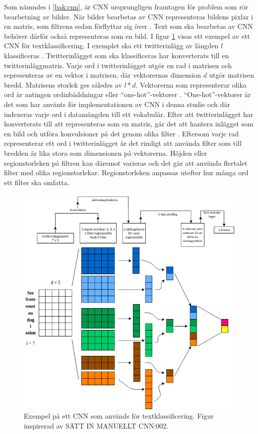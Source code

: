 \documentclass{kaumasters} %
\begin{document}
Som nämndes i \ref{bak:cnn}, är CNN ursprungligen framtagen för problem som rör bearbetning av bilder. När bilder bearbetas av CNN representeras bildens pixlar i en matris, som filtrena sedan förflyttar sig över \cite{cnn:004}. Text som ska bearbetas av CNN behöver därför också representeras som en bild. I figur \ref{fig:cnntext} visas ett exempel av ett CNN för textklassificering. I exemplet ska ett twitterinlägg av längden $l$ klassificeras \cite{cnn:002}. Twitterinlägget som ska klassificeras har konverterats till en twitterinläggmatris. Varje ord i twitterinlägget utgör en rad i matrisen och representeras av en vektor i matrisen, där vektorernas dimension $d$ utgör matrisen bredd. Matrisens storlek ges således av $l*d$. Vektorerna som representerar olika ord är antingen ordinbäddningar \cite{wiki:016} eller “one-hot”-vektorer \cite{cnn:004}. “One-hot”-vektorer är det som har använts för implementationen av CNN i denna studie och där indexeras varje ord i datamängden till ett vokabulär. Efter att twitterinlägget har konverterats till att representeras som en matris, går det att hantera inlägget som en bild och utföra konvulsioner på det genom olika filter \cite{cnn:002}. Eftersom varje rad representerar ett ord i twitterinlägget är det rimligt att använda filter som till bredden är lika stora som dimensionen på vektorerna. Höjden eller regionstorleken på filtren kan däremot varieras och det går att använda flertalet filter med olika regionstorlekar. Regionstorleken anpassas utefter hur många ord ett filter ska omfatta. 

\begin{figure}[H]
\includegraphics[width=12cm]{cnn_text}
\centering
\caption{Exempel på ett CNN som används för textklassificering. Figur inspirerad av SÄTT IN MANUELLT CNN:002.}
\label{fig:cnntext}
\end{figure}
\end{document}
